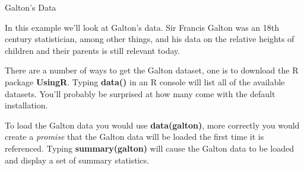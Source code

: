 \documentclass[11pt]{beamer}
\begin{document}
\begin{frame}{
	\begin{minipage}[t]{0.55\textwidth}
		Galton's Data
	\end{minipage}
	\hfill
	\begin{minipage}[t]{0.35\textwidth}
		\flushright
	\end{minipage}
}{}
In this example we'll look at Galton's data. Sir Francis Galton was an 18th century statistician, among other things, and his data on the relative heights of children and their parents is still relevant today. 

\vspace{0.5cm}

There are a number of ways to get the Galton dataset, one is to download the R package \textbf{UsingR}. Typing \textbf{data()} in an R console will list all of the available datasets. You'll probably be surprised at how many come with the default installation. 

\vspace{0.5cm}

To load the Galton data you would use \textbf{data(galton)}, more correctly you would create a \textit{promise} that the Galton data will be loaded the first time it is referenced. Typing \textbf{summary(galton)} will cause the Galton data to be loaded and display a set of summary statistics.
 
\begin{center}

\end{center}
\end{frame}
\end{document}
